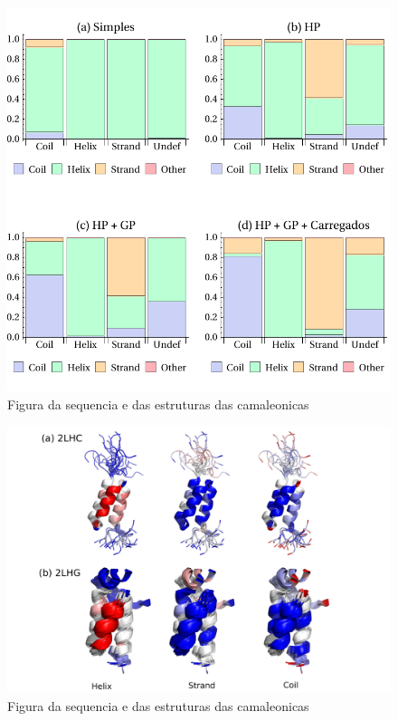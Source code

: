 \begin{figure}
  \centering
  \includegraphics[width=.9\textwidth]{figures/chamel_errors_ca.pdf}
  \caption{Figura da sequencia e das estruturas das camaleonicas}
        \label{fig:ca_errors}
\end{figure}

\begin{figure}
  \centering
  \includegraphics[width=1\textwidth]{figures/camel_2lhc_2lhg.pdf}
  \caption{Figura da sequencia e das estruturas das camaleonicas}
        \label{fig:camel_2lhc_2lhg}
\end{figure}

